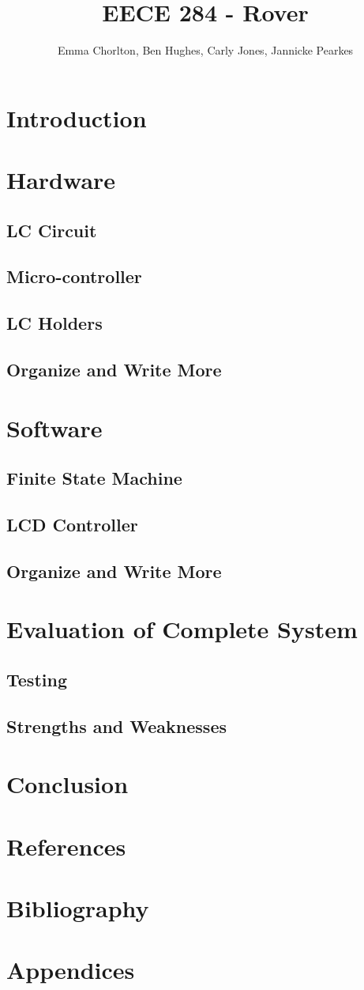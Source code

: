 \documentclass{report}
\author{Emma Chorlton, Ben Hughes, Carly Jones, Jannicke Pearkes }
\title{EECE 284 - Rover}
\begin{document}
\maketitle
\tableofcontents

\section{Introduction}

\section{Hardware}
\subsection{LC Circuit}
\subsection{Micro-controller}
\subsection{LC Holders}
\subsection{Organize and Write More}

\section{Software}
\subsection{Finite State Machine}
\subsection{LCD Controller}
\subsection{Organize and Write More}

\section{Evaluation of Complete System}
\subsection{Testing}
\subsection{Strengths and Weaknesses}

\section{Conclusion}


\section{References}

\section{Bibliography}

\section{Appendices}
\end{document}
